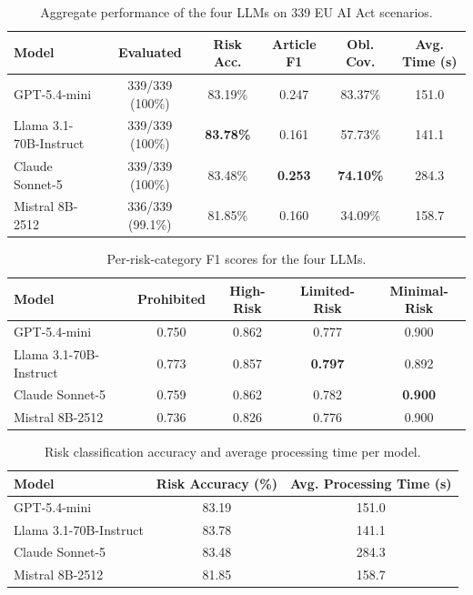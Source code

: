 
\begin{table}[htbp]
  \centering
  \caption{Aggregate performance of the four LLMs on 339 EU AI Act scenarios.}
  \label{tab:multi-model-aggregate}
  {\small\setlength{\tabcolsep}{2pt}
  \begin{tabular}{@{}l c c c c c@{}}
    \toprule
    \textbf{Model} & \textbf{Evaluated} & \textbf{Risk Acc.} & \textbf{Article F1} & \textbf{Obl. Cov.} & \textbf{Avg. Time (s)} \\
    \midrule
    GPT-5.4-mini & 339/339 (100\%) & 83.19\% & 0.247 & 83.37\% & 151.0 \\
    Llama 3.1-70B-Instruct & 339/339 (100\%) & \textbf{83.78\%} & 0.161 & 57.73\% & 141.1 \\
    Claude Sonnet-5 & 339/339 (100\%) & 83.48\% & \textbf{0.253} & \textbf{74.10\%} & 284.3 \\
    Mistral 8B-2512 & 336/339 (99.1\%) & 81.85\% & 0.160 & 34.09\% & 158.7 \\
    \bottomrule
  \end{tabular}}
\end{table}

\begin{table}[htbp]
  \centering
  \caption{Per-risk-category F1 scores for the four LLMs.}
  \label{tab:multi-model-f1}
  \begin{tabular}{@{}l c c c c@{}}
    \toprule
    \textbf{Model} & \textbf{Prohibited} & \textbf{High-Risk} & \textbf{Limited-Risk} & \textbf{Minimal-Risk} \\
    \midrule
    GPT-5.4-mini & 0.750 & 0.862 & 0.777 & 0.900 \\
    Llama 3.1-70B-Instruct & 0.773 & 0.857 & \textbf{0.797} & 0.892 \\
    Claude Sonnet-5 & 0.759 & 0.862 & 0.782 & \textbf{0.900} \\
    Mistral 8B-2512 & 0.736 & 0.826 & 0.776 & 0.900 \\
    \bottomrule
  \end{tabular}
\end{table}

\begin{table}[htbp]
  \centering
  \caption{Risk classification accuracy and average processing time per model.}
  \label{tab:multi-model-accuracy-time}
  \begin{tabular}{@{}l c c@{}}
    \toprule
    \textbf{Model} & \textbf{Risk Accuracy (\%)} & \textbf{Avg. Processing Time (s)} \\
    \midrule
    GPT-5.4-mini & 83.19 & 151.0 \\
    Llama 3.1-70B-Instruct & 83.78 & 141.1 \\
    Claude Sonnet-5 & 83.48 & 284.3 \\
    Mistral 8B-2512 & 81.85 & 158.7 \\
    \bottomrule
  \end{tabular}
\end{table}
